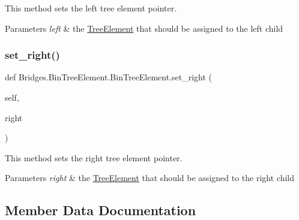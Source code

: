 This method sets the left tree element pointer. 


\begin{DoxyParams}{Parameters}
{\em left} & the \mbox{\hyperlink{namespace_bridges_1_1_tree_element}{Tree\+Element}} that should be assigned to the left child \\
\hline
\end{DoxyParams}
\mbox{\label{class_bridges_1_1_bin_tree_element_1_1_bin_tree_element_ac93c9e5553a10645c6157a14fe85dda6}} 
\subsubsection{\texorpdfstring{set\+\_\+right()}{set\_right()}}
{\footnotesize\ttfamily def Bridges.\+Bin\+Tree\+Element.\+Bin\+Tree\+Element.\+set\+\_\+right (\begin{DoxyParamCaption}\item[{}]{self,  }\item[{}]{right }\end{DoxyParamCaption})}



This method sets the right tree element pointer. 


\begin{DoxyParams}{Parameters}
{\em right} & the \mbox{\hyperlink{namespace_bridges_1_1_tree_element}{Tree\+Element}} that should be assigned to the right child \\
\hline
\end{DoxyParams}


\subsection{Member Data Documentation}
\mbox{\label{class_bridges_1_1_bin_tree_element_1_1_bin_tree_element_ae2011efda691620e8c76e366131b0195}} 
